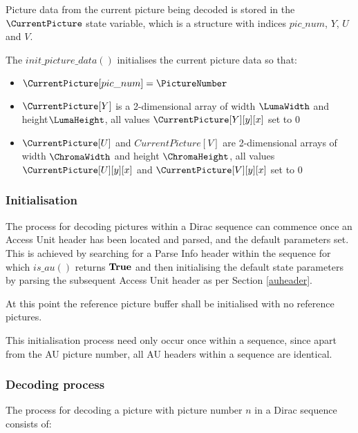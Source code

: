 Picture data from the current picture being decoded is stored in the $\CurrentPicture$ state
variable, which is a structure with indices $pic\_num$, $Y$, $U$ and $V$.


The $init\_picture\_data()$ initialises the current picture data so that:
\begin{itemize}
\item $\CurrentPicture[pic\_num]=\PictureNumber$
\item $\CurrentPicture[Y]$ is a 2-dimensional array of width $\LumaWidth$ and height$\LumaHeight$, 
all values $\CurrentPicture[Y][y][x]$ set to 0
\item $\CurrentPicture[U]$ and $CurrentPicture[V]$ are 2-dimensional arrays of width $\ChromaWidth$ and height $\ChromaHeight$, 
all values $\CurrentPicture[U][y][x]$ and $\CurrentPicture[V][y][x]$ set to 0
\end{itemize}

\subsubsection{Initialisation}
\label{picturedecodinginit}

The process for decoding pictures within a Dirac sequence can commence 
once an Access Unit header has been
located and parsed, and the default parameters set. This is achieved by 
searching for a Parse Info header within the sequence for which
$is\_au()$ returns $\text{\bf{True}}$ and then initialising the default state parameters
 by parsing the subsequent Access Unit header as per Section \ref{auheader}.

At this point the reference picture buffer shall be initialised with no reference pictures.

This initialisation process need only occur once within a sequence, since
apart from the AU picture number, all AU headers within a sequence are
identical. 

\subsubsection{Decoding process}
\label{picturedecprocess}

The process for decoding a picture with picture number 
$n$ in a Dirac sequence consists of:

